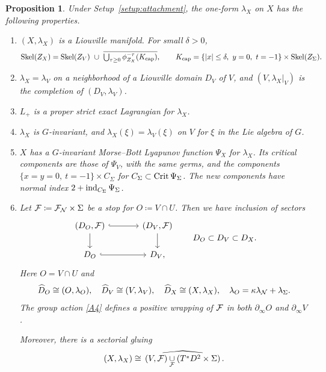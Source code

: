 \documentclass[12pt, letter]{amsart}
\newtheorem{proposition}[dummy]{Proposition}
\theoremstyle{definition}
\begin{document}
\begin{proposition}
\label{prop:gluing_Liouville_form}
Under Setup~\ref{setup:attachment}, the one-form $\lambda_X$ on $X$  has the following properties.
\begin{enumerate}[label=\textup{(\roman*)}]
\item 
\label{item:i}
$(X,\lambda_X)$ is a Liouville manifold.
For small $\delta>0$,
\[
 \Skel(Z_X)=\Skel(Z_V)\ \cup\ \overline{\textstyle\bigcup_{\tau\ge0}\phi_{Z_X}^{-\tau}(K_{\capp})},
 \qquad K_{\capp}=\{|x|\le\delta,\ y=0,\ t=-1\}\times\Skel(Z_\Sigma).
\]
\item\label{item:ii} $\lambda_X=\lambda_V$ on a neighborhood of a Liouville domain $D_V$ of $V$, and $(V,\lambda_X|_V)$ is the completion of $(D_V,\lambda_V)$.

\item\label{item:iii} $L_+$ is a proper strict exact Lagrangian for $\lambda_X$.

\item\label{item:iv} $\lambda_X$ is $G$-invariant, and $\lambda_X(\xi)=\lambda_V(\xi)$ on $V$ for $\xi$ in the Lie algebra of $G$.

\item\label{item:v} $X$ has a $G$-invariant Morse--Bott Lyapunov function $\Psi_X$ for $\lambda_X$.
Its critical components are those of $\Psi_V$, with the same germs, and the components $\{x=y=0,\ t=-1\}\times C_\Sigma$ for $C_\Sigma\subset\operatorname{Crit}\Psi_\Sigma$.
The new components have normal index $2+\operatorname{ind}_{C_\Sigma}\Psi_\Sigma$.
\item\label{item:vii} Let \(\mathcal{F} \coloneqq \mathcal{F}_{\mathcal{N}} \times \Sigma\) be a stop for \(O \coloneqq V \cap U\). Then we have inclusion of sectors
\begin{equation}\label{eq:geometric-square}
 \begin{tikzcd}[column sep=large]
 (D_O,\cF)\arrow[r,hook]\arrow[d] & (D_V,\cF)\arrow[d]\\
 D_O\arrow[r,hook] & D_V,
 \end{tikzcd}
 \qquad D_O\subset D_V\subset D_X.
\end{equation}
Here $O=V\cap U$ and
\[
 \widehat D_O\cong(O,\lambda_O),\quad
 \widehat D_V\cong(V,\lambda_V),\quad
 \widehat D_X\cong(X,\lambda_X),\quad
 \lambda_O=\kappa \lambda_{\mathcal{N}} + \lambda_\Sigma. 
\]
The group action \ref{A4} defines a positive wrapping of \(\mathcal{F}\) in both \(\partial_\infty O\) and \( \partial_\infty V\). 

Moreover,
there is a sectorial gluing
\begin{equation}\label{eq:abstract-sectorial-gluing}
 (X,\lambda_X)\cong
 \widehat{\,(V,\mathcal{F})\underset{\mathcal{F}}{\cup}(T^*D^2\times\Sigma)\,}.
\end{equation}
\end{enumerate}
\end{proposition}
\end{document}
